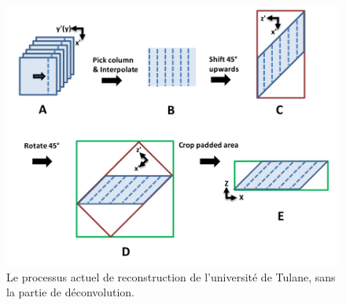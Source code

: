 {	    \begin{figure}[h]
	        \centering
	        \includegraphics[width=.65\linewidth]{img/tulane_process.png}
	        \captionsetup{width=.8\linewidth}
	        \caption{Le processus actuel de reconstruction de l'université de Tulane, sans la partie de déconvolution.}
	        \label{img:tulane_process:reconstruction}
	    \end{figure}
	    
	    
    
}
